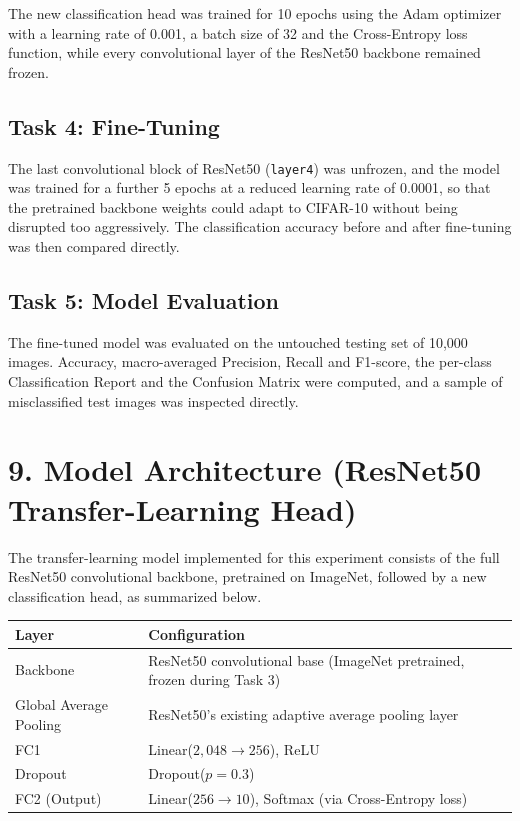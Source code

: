 \documentclass[11pt,a4paper]{article}
\begin{document}
The new classification head was trained for 10 epochs using the Adam optimizer with a learning rate of 0.001, a batch size of 32 and the Cross-Entropy loss function, while every convolutional layer of the ResNet50 backbone remained frozen.

\subsection*{Task 4: Fine-Tuning}

The last convolutional block of ResNet50 (\texttt{layer4}) was unfrozen, and the model was trained for a further 5 epochs at a reduced learning rate of 0.0001, so that the pretrained backbone weights could adapt to CIFAR-10 without being disrupted too aggressively. The classification accuracy before and after fine-tuning was then compared directly.

\subsection*{Task 5: Model Evaluation}

The fine-tuned model was evaluated on the untouched testing set of 10,000 images. Accuracy, macro-averaged Precision, Recall and F1-score, the per-class Classification Report and the Confusion Matrix were computed, and a sample of misclassified test images was inspected directly.

\section*{9. Model Architecture (ResNet50 Transfer-Learning Head)}

The transfer-learning model implemented for this experiment consists of the full ResNet50 convolutional backbone, pretrained on ImageNet, followed by a new classification head, as summarized below.

\begin{center}
\begin{tabular}{|p{5.5cm}|p{9.5cm}|}
\hline
\textbf{Layer} & \textbf{Configuration}\\
\hline
Backbone & ResNet50 convolutional base (ImageNet pretrained, frozen during Task 3)\\
\hline
Global Average Pooling & ResNet50's existing adaptive average pooling layer\\
\hline
FC1 & Linear($2{,}048 \rightarrow 256$), ReLU\\
\hline
Dropout & Dropout($p=0.3$)\\
\hline
FC2 (Output) & Linear($256 \rightarrow 10$), Softmax (via Cross-Entropy loss)\\
\hline
\end{tabular}
\end{center}
\end{document}
